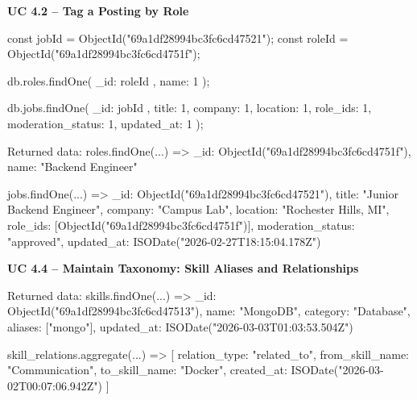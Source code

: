 \documentclass[11pt]{article}
\begin{document}
\noindent
\textbf{UC 4.2 -- Tag a Posting by Role}
\begin{TerminalBlock}
const jobId = ObjectId("69a1df28994bc3fc6cd47521");
const roleId = ObjectId("69a1df28994bc3fc6cd4751f");

db.roles.findOne(
  { _id: roleId },
  { name: 1 }
);

db.jobs.findOne(
  { _id: jobId },
  {
    title: 1,
    company: 1,
    location: 1,
    role_ids: 1,
    moderation_status: 1,
    updated_at: 1
  }
);
\end{TerminalBlock}
\begin{TerminalBlock}
Returned data:
roles.findOne(...) =>
{
  _id: ObjectId("69a1df28994bc3fc6cd4751f"),
  name: "Backend Engineer"
}

jobs.findOne(...) =>
{
  _id: ObjectId("69a1df28994bc3fc6cd47521"),
  title: "Junior Backend Engineer",
  company: "Campus Lab",
  location: "Rochester Hills, MI",
  role_ids: [ObjectId("69a1df28994bc3fc6cd4751f")],
  moderation_status: "approved",
  updated_at: ISODate("2026-02-27T18:15:04.178Z")
}
\end{TerminalBlock}

\noindent
\textbf{UC 4.4 -- Maintain Taxonomy: Skill Aliases and Relationships}
\begin{TerminalBlock}
Returned data:
skills.findOne(...) =>
{
  _id: ObjectId("69a1df28994bc3fc6cd47513"),
  name: "MongoDB",
  category: "Database",
  aliases: ["mongo"],
  updated_at: ISODate("2026-03-03T01:03:53.504Z")
}

skill_relations.aggregate(...) =>
[
  {
    relation_type: "related_to",
    from_skill_name: "Communication",
    to_skill_name: "Docker",
    created_at: ISODate("2026-03-02T00:07:06.942Z")
  }
]
\end{TerminalBlock}
\end{document}
